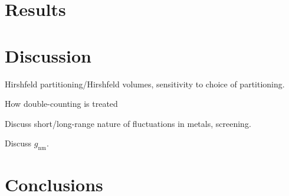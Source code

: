 \section{Results}

\section{Discussion}

Hirshfeld partitioning/Hirshfeld volumes, sensitivity to choice of partitioning.

How double-counting is treated

Discuss short/long-range nature of fluctuations in metals, screening.

Discuss $g_\text{nm}$.

\section{Conclusions}
